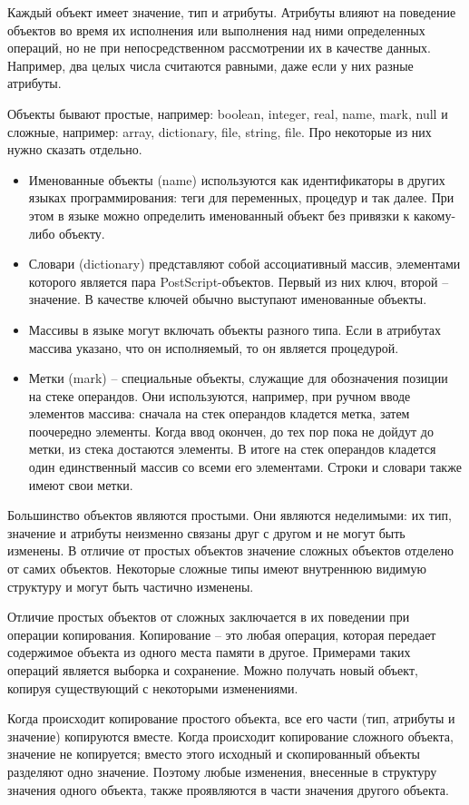 Каждый объект имеет значение, тип и атрибуты. Атрибуты влияют на поведение объектов во время их исполнения или выполнения над ними определенных операций, но не при непосредственном рассмотрении их в качестве данных. Например, два целых числа считаются равными, даже если у них разные атрибуты.

Объекты бывают простые, например: boolean, integer, real, name, mark, null и сложные, например: array, dictionary, file, string, file. Про некоторые из них нужно сказать отдельно.
\begin{itemize}
\item Именованные объекты (name) используются как идентификаторы в других языках программирования: теги для переменных, процедур и так далее. При этом в языке можно определить именованный объект без привязки к какому-либо объекту.
\item Словари (dictionary) представляют собой ассоциативный массив, элементами которого является пара PostScript-объектов. Первый из них ключ, второй -- значение. В качестве ключей обычно выступают именованные объекты.
\item Массивы в языке могут включать объекты разного типа. Если в атрибутах массива указано, что он исполняемый, то он является процедурой.
\item Метки (mark) -- специальные объекты, служащие для обозначения позиции на стеке операндов. Они используются, например, при ручном вводе элементов массива: сначала на стек операндов кладется метка, затем поочередно элементы. Когда ввод окончен, до тех пор пока не дойдут до метки, из стека достаются элементы. В итоге на стек операндов кладется один единственный массив со всеми его элементами. Строки и словари также имеют свои метки.
\end{itemize}

Большинство объектов являются простыми. Они являются неделимыми: их тип, значение и атрибуты неизменно связаны друг с другом и не могут быть изменены. В отличие от простых объектов значение сложных объектов отделено от самих объектов. Некоторые сложные типы имеют внутреннюю видимую структуру и могут быть частично изменены.

Отличие простых объектов от сложных заключается в их поведении при операции копирования. Копирование – это любая операция, которая передает содержимое объекта из одного места памяти в другое. Примерами таких операций является выборка и сохранение. Можно получать новый объект, копируя существующий с некоторыми изменениями.

Когда происходит копирование простого объекта, все его части (тип, атрибуты и значение) копируются вместе. Когда происходит копирование сложного объекта, значение не копируется; вместо этого исходный и скопированный объекты разделяют одно значение.  Поэтому любые изменения, внесенные в структуру значения одного объекта, также проявляются в части значения другого объекта.

